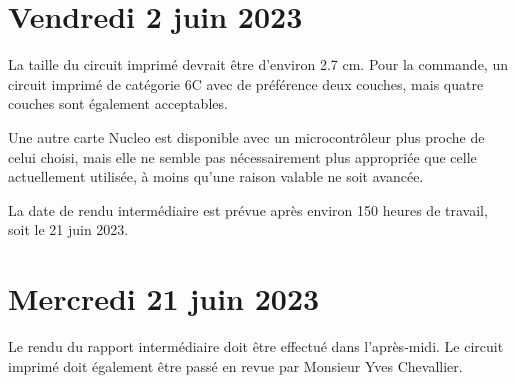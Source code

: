 \section{Vendredi 2 juin 2023}

La taille du circuit imprimé devrait être d'environ 2.7 cm. Pour la commande, un circuit imprimé de catégorie 6C avec de préférence deux couches, mais quatre couches sont également acceptables.

Une autre carte Nucleo est disponible avec un microcontrôleur plus proche de celui choisi, mais elle ne semble pas nécessairement plus appropriée que celle actuellement utilisée, à moins qu'une raison valable ne soit avancée.

La date de rendu intermédiaire est prévue après environ 150 heures de travail, soit le 21 juin 2023.

\section{Mercredi 21 juin 2023}

Le rendu du rapport intermédiaire doit être effectué dans l'après-midi.
Le circuit imprimé doit également être passé en revue par Monsieur Yves Chevallier.
